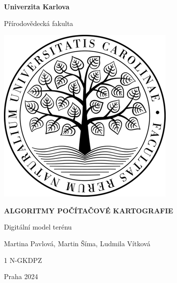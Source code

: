 \documentclass{article}
\begin{document}
\begin{titlepage}
    \centering
    \Large\textbf{Univerzita Karlova}
    
    \Large{Přírodovědecká fakulta}
    
    \vspace*{2.5cm}
    \includegraphics[width=0.55\linewidth]{images/prf.png}
    \vspace*{4cm}
    
    \Large\textbf{ALGORITMY POČÍTAČOVÉ KARTOGRAFIE}
    
    \Large{Digitální model terénu}
    
    \vspace*{3cm}
    \large Martina Pavlová, Martin Šíma, Ludmila Vítková

    1 N-GKDPZ
    
    Praha 2024
\end{titlepage}
\end{document}
